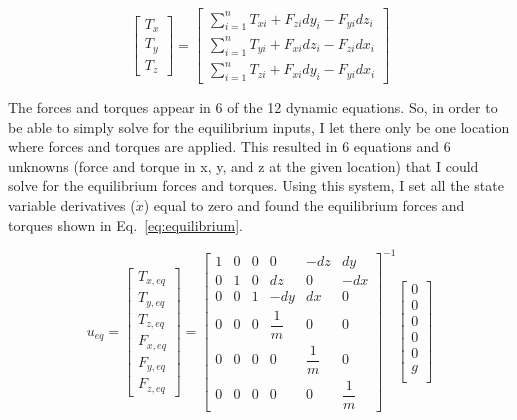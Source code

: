 \documentclass{article}
\begin{document}
\begin{equation}\label{eq:Torque}
\begin{bmatrix}
T_x \\
T_y \\
T_z
\end{bmatrix}=
\begin{bmatrix}
\sum_{i=1}^{n} T_{xi} + F_{zi} dy_i - F_{yi} dz_i \\
\sum_{i=1}^{n} T_{yi} + F_{xi} dz_i - F_{zi} dx_i \\
\sum_{i=1}^{n} T_{zi} + F_{xi} dy_i - F_{yi} dx_i
\end{bmatrix}
\end{equation}

The forces and torques appear in 6 of the 12 dynamic equations. So, in order to be able to simply solve for the equilibrium inputs, I let there only be one location where forces and torques are applied. This resulted in 6 equations and 6 unknowns (force and torque in x, y, and z at the given location) that I could solve for the equilibrium forces and torques. Using this system, I set all the state variable derivatives ($\dot{x}$) equal to zero and found the equilibrium forces and torques shown in Eq.~\ref{eq:equilibrium}. 

\begin{equation}\label{eq:equilibrium}
u_{eq}=
\begin{bmatrix}
T_{x,eq} \\
T_{y,eq} \\
T_{z,eq} \\
F_{x,eq} \\
F_{y,eq} \\
F_{z,eq}
\end{bmatrix}=
\begin{bmatrix}
1 & 0 & 0 & 0 & -dz & dy \\
0 & 1 & 0 & dz & 0 & -dx \\
0 & 0 & 1 & -dy & dx & 0 \\
0 & 0 & 0 & \dfrac{1}{m} & 0 & 0 \\
0 & 0 & 0 & 0 & \dfrac{1}{m} & 0  \\
0 & 0 & 0 & 0 & 0 & \dfrac{1}{m} 
\end{bmatrix}^{-1}
\begin{bmatrix}
0 \\
0 \\
0 \\
0 \\
0 \\
g \\
\end{bmatrix}
\end{equation}
\end{document}

